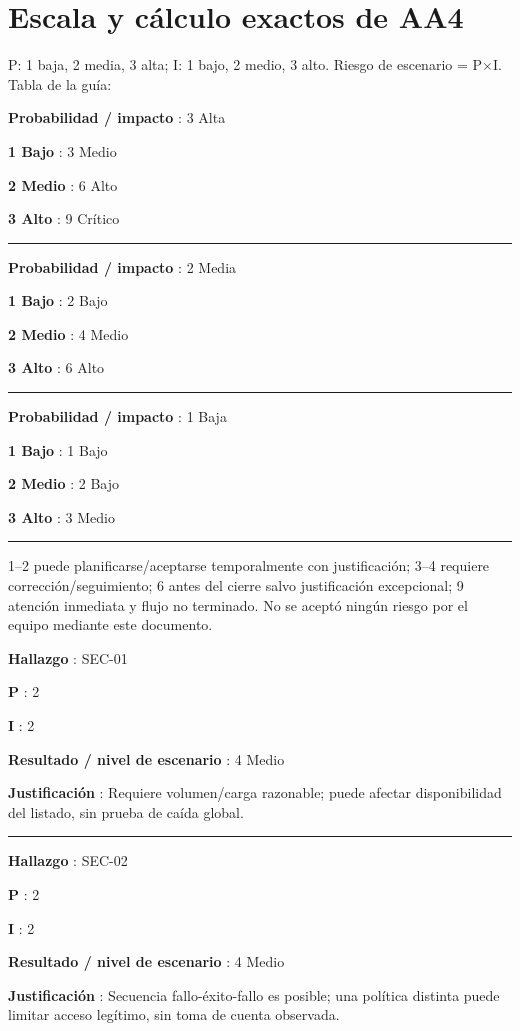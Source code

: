 \documentclass[12pt,a4paper]{report}
\begin{document}
\section{Escala y cálculo exactos de
AA4}\label{AA4-semana-4-escala-y-cuxe1lculo-exactos-de-aa4}

P: 1 baja, 2 media, 3 alta; I: 1 bajo, 2 medio, 3 alto. Riesgo de
escenario = P\ensuremath{\times}I. Tabla de la guía:

\textbf{Probabilidad / impacto }: 3 Alta

\textbf{1 Bajo }: 3 Medio

\textbf{2 Medio }: 6 Alto

\textbf{3 Alto }: 9 Crítico

\medskip\hrule\medskip

\textbf{Probabilidad / impacto }: 2 Media

\textbf{1 Bajo }: 2 Bajo

\textbf{2 Medio }: 4 Medio

\textbf{3 Alto }: 6 Alto

\medskip\hrule\medskip

\textbf{Probabilidad / impacto }: 1 Baja

\textbf{1 Bajo }: 1 Bajo

\textbf{2 Medio }: 2 Bajo

\textbf{3 Alto }: 3 Medio

\medskip\hrule\medskip

1--2 puede planificarse/aceptarse temporalmente con justificación; 3--4
requiere corrección/seguimiento; 6 antes del cierre salvo justificación
excepcional; 9 atención inmediata y flujo no terminado. No se aceptó
ningún riesgo por el equipo mediante este documento.

\textbf{Hallazgo }: SEC-01

\textbf{P }: 2

\textbf{I }: 2

\textbf{Resultado / nivel de escenario }: 4 Medio

\textbf{Justificación }: Requiere volumen/carga razonable; puede afectar
disponibilidad del listado, sin prueba de caída global.

\medskip\hrule\medskip

\textbf{Hallazgo }: SEC-02

\textbf{P }: 2

\textbf{I }: 2

\textbf{Resultado / nivel de escenario }: 4 Medio

\textbf{Justificación }: Secuencia fallo-éxito-fallo es posible; una
política distinta puede limitar acceso legítimo, sin toma de cuenta
observada.
\end{document}
